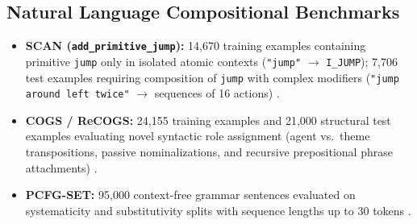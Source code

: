 \documentclass{article}
\theoremstyle{plain}
\theoremstyle{definition}
\begin{document}
\subsection{Natural Language Compositional Benchmarks}
\begin{itemize}[leftmargin=*,noitemsep]
    \item \textbf{SCAN (\texttt{add\_primitive\_jump}):} 14,670 training examples containing primitive \texttt{jump} only in isolated atomic contexts (\texttt{"jump"} $\to$ \texttt{I\_JUMP}); 7,706 test examples requiring composition of \texttt{jump} with complex modifiers (\texttt{"jump around left twice"} $\to$ sequences of 16 actions) \citep{Lake2018Generalization}.
    \item \textbf{COGS / ReCOGS:} 24,155 training examples and 21,000 structural test examples evaluating novel syntactic role assignment (agent vs.\ theme transpositions, passive nominalizations, and recursive prepositional phrase attachments) \citep{Kim2020COGS,Wu2023ReCOGS}.
    \item \textbf{PCFG-SET:} 95,000 context-free grammar sentences evaluated on systematicity and substitutivity splits with sequence lengths up to 30 tokens \citep{Hupkes2019Compositionality}.
\end{itemize}
\end{document}
